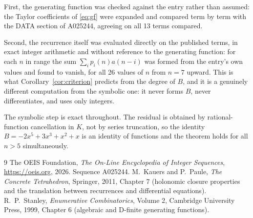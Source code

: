 \documentclass[11pt,a4paper]{article}
\theoremstyle{plain}
\theoremstyle{definition}
\begin{document}
First, the generating function was checked against the entry rather than assumed: the
Taylor coefficients of \eqref{eq:gf} were expanded and compared term by term with the DATA
section of A025244, agreeing on all 13 terms compared.

Second, the recurrence itself was evaluated directly on the published terms, in exact
integer arithmetic and without reference to the generating function: for each $n$ in range
the sum $\sum_{i}p_{i}(n)a(n-i)$ was formed from the entry's own values and found to
vanish, for all 26 values of $n$ from $n=7$ upward. This is what
Corollary~\ref{cor:criterion} predicts from the degree of $B$, and it is a genuinely
different computation from the symbolic one: it never forms $B$, never differentiates, and
uses only integers.

The symbolic step is exact throughout. The residual is obtained by rational-function
cancellation in $K$, not by series truncation, so the identity $B=- 2 x^{5} + 3 x^{3} + x^{2} + x$ is an
identity of functions and the theorem holds for all $n>5$ simultaneously.

\begin{thebibliography}{9}
 The OEIS Foundation, \emph{The On-Line Encyclopedia of Integer Sequences},
\url{https://oeis.org}, 2026. Sequence A025244.
 M.~Kauers and P.~Paule, \emph{The Concrete Tetrahedron}, Springer, 2011,
Chapter 7 (holonomic closure properties and the translation between recurrences and
differential equations).
 R.~P.~Stanley, \emph{Enumerative Combinatorics}, Volume 2, Cambridge
University Press, 1999, Chapter 6 (algebraic and D-finite generating functions).
\end{thebibliography}
\end{document}
